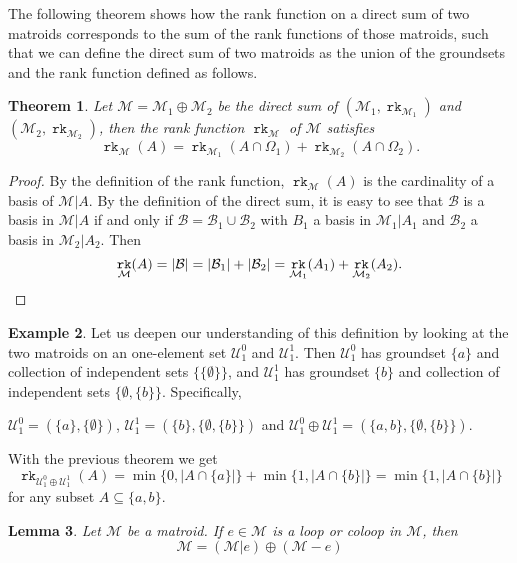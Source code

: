 \documentclass[12pt,a4paper, twoside, autooneside=false]{scrartcl}
\newtheorem{theorem}{Theorem}[section]
\newtheorem{lemma}[theorem]{Lemma}
\theoremstyle{definition}
\newtheorem{beispiel}[theorem]{Example}
\theoremstyle{remark}
\numberwithin{equation}{section}
\DeclareMathOperator{\rk}{\mathtt{rk}}
\newcommand{\M}{\mathcal{M}} %
\begin{document}
The following theorem shows how the rank function on a direct sum of two matroids corresponds to the sum of the rank functions of those matroids, such that we can define the direct sum of two matroids as the union of the groundsets and the rank function defined as follows.
\begin{theorem}
Let $\M = \M_1 \oplus \M_2$ be the direct sum of $(\M_1, \rk_{\M_1})$ and $(\M_2, \rk_{\M_2})$, then the rank function $\rk_{\M}$ of $\M$ satisfies
\[
\rk_{\M}(A) = \rk_{\M_1}(A \cap \Omega_1) + \rk_{\M_2}(A \cap \Omega_2).
\]
\end{theorem}
\begin{proof}
By the definition of the rank function, $\rk_{\M}(A)$ is the cardinality of a basis of $\M | A$. By the definition of the direct sum, it is easy to see that $\mathcal{B}$ is a basis in $\M |A$ if and only if $\mathcal{B} = \mathcal{B}_1 \cup \mathcal{B}_2$ with $B_1$ a basis in $\M_1 | A_1$ and $\mathcal{B}_2$ a basis in $\M_2 |A_2$. Then 
\[
\rk_{\M}(A) = |\mathcal{B}| = |\mathcal{B}_1| + |\mathcal{B}_2| = \rk_{\M_1}(A_1) + \rk_{\M_2}(A_2). \qedhere
\]
\end{proof}
\begin{beispiel}
Let us deepen our understanding of this definition by looking at the two matroids on an one-element set $\mathcal{U}_1^0$ and $\mathcal{U}_1^1$. Then 
$\mathcal{U}_1^0$ has groundset $\{a\}$ and collection of independent sets $\{\{\emptyset\}\}$, and $\mathcal{U}_1^1$ has groundset $\{b\}$ and collection of independent sets $\{\emptyset, \{b\}\}$. Specifically,
\begin{center}
$\mathcal{U}_1^0 = (\{a\}, \{\emptyset\})$, $\mathcal{U}_1^1 = (\{b\}, \{\emptyset, \{b\}\})$ and $\mathcal{U}_1^0 \oplus \mathcal{U}_1^1 = (\{a,b\}, \{\emptyset, \{b\}\})$.
\end{center}
With the previous theorem we get
\[
\rk_{\mathcal{U}_1^0 \oplus \mathcal{U}_1^1}(A) = \min\{0, |A \cap \{a\}|\} + \min\{1, |A \cap \{b\}|\} = \min\{1, |A \cap \{b\}|\} 
\]
for any subset $A \subseteq \{a,b\}$.
\end{beispiel}
\begin{lemma}
Let $\M$ be a matroid. If $e \in \M$ is a loop or coloop in $\M$, then 
\[
\M = \left(\M|e\right) \oplus \left(\M - e\right)
\]
\end{lemma}
\end{document}
